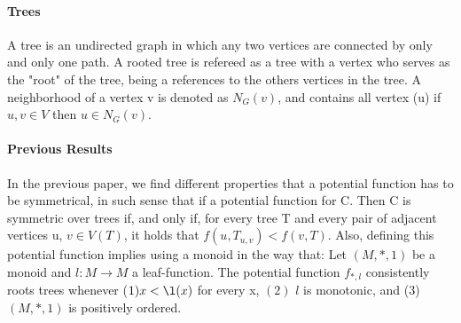 \paragraph{Trees} A tree is an undirected graph in which any two vertices are connected by only and only one path. A rooted tree is refereed as a tree with a vertex who serves as the "root" of the tree, being a references to the others  vertices in the tree. A neighborhood of a vertex v is denoted as $N_{G}(v)$, and contains all vertex (u) if ${u,v} \in V$ then $u \in N_{G}(v)$.

\paragraph{Previous Results} In the previous paper, we find different properties that a potential function has to be symmetrical, in such sense that if a potential function for C. Then C is
symmetric over trees if, and only if, for every tree T and every pair of adjacent vertices u, $v \in V(T)$, it holds that $f(u, T_{u,v}) < f(v, T)$. Also, defining this potential function implies using a monoid in the way that: Let $(M, \ast, 1)$ be a monoid and $l : M \rightarrow M$ a leaf-function. The potential function $f_{\ast,l}$ consistently roots trees whenever ($1) x < \l(x)$ for every x, $(2)$ $l$ is monotonic, and (3) $(M, \ast, 1)$ is positively ordered.

\cite{RiverosS20}
\cite{RiverosSS23}

